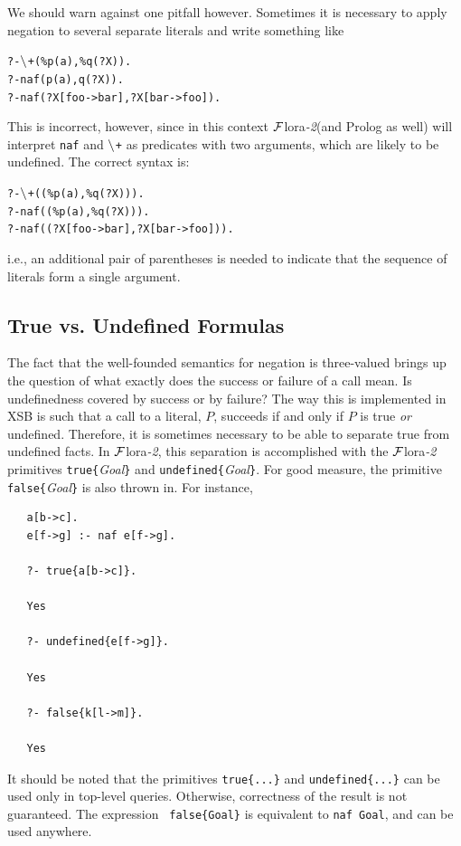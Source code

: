 \documentclass[11pt]{article}
\newcommand{\FLORA}{{\mbox{\sc ${\cal F}${lora}\rm\emph{-2}}}\xspace}
\newcommand{\PLGNAF}{\mbox{\tt \ensuremath{\tt\backslash}+}\xspace}
\newcommand{\RULELOGNAF}{{{\tt naf}}\xspace}
\begin{document}
We should warn against one pitfall however. Sometimes it is necessary to
apply negation to several separate literals and write something like
\begin{alltt}
       ?- \PLGNAF(\%p(a),\%q(?X)).
       ?- \RULELOGNAF(p(a),q(?X)).
       ?- \RULELOGNAF(?X[foo->bar], ?X[bar->foo]).
\end{alltt}
This is incorrect, however, since in this context \FLORA (and Prolog as
well) will interpret \RULELOGNAF and \PLGNAF as predicates with two arguments,
which are likely to be undefined. The correct syntax is:
\begin{alltt}
       ?- \PLGNAF((\%p(a),\%q(?X))).
       ?- \RULELOGNAF((\%p(a),\%q(?X))).
       ?- \RULELOGNAF((?X[foo->bar], ?X[bar->foo])).
\end{alltt}
i.e., an additional pair of parentheses is needed to indicate that
the sequence of literals form a single argument.

\subsection{True vs. Undefined Formulas}

The fact that the well-founded semantics for negation is three-valued
brings up the question of what exactly does the success or failure of a
call mean. Is undefinedness covered by success or by failure?  The way
this is implemented in XSB is such that a call to a literal, $P$, succeeds
if and only if $P$ is true \emph{or} undefined.  Therefore, it is sometimes
necessary to be able to separate true from undefined facts. In \FLORA, this
separation is accomplished with the \FLORA primitives
{\tt true\{}\emph{Goal}{\tt \}} and {\tt undefined\{}\emph{Goal}{\tt \}}.
For good measure, the primitive {\tt false\{}\emph{Goal}{\tt \}} is also
thrown in. For instance,
\begin{verbatim}
   a[b->c].
   e[f->g] :- naf e[f->g].

   ?- true{a[b->c]}.

   Yes

   ?- undefined{e[f->g]}.

   Yes

   ?- false{k[l->m]}.

   Yes
\end{verbatim}
It should be noted that the primitives {\tt true\{...\}}  and
{\tt undefined\{...\}} can be used only in top-level queries. Otherwise,
correctness of the result is not guaranteed. The expression {\tt
  false\{Goal\}} is equivalent to {\tt naf Goal},  and can be used
anywhere.
\end{document}
